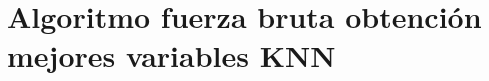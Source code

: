 \chapter{Algoritmo fuerza bruta obtención mejores variables KNN}
\label{cap:Algoritmo fuerza bruta obtención mejores variables KNN}


